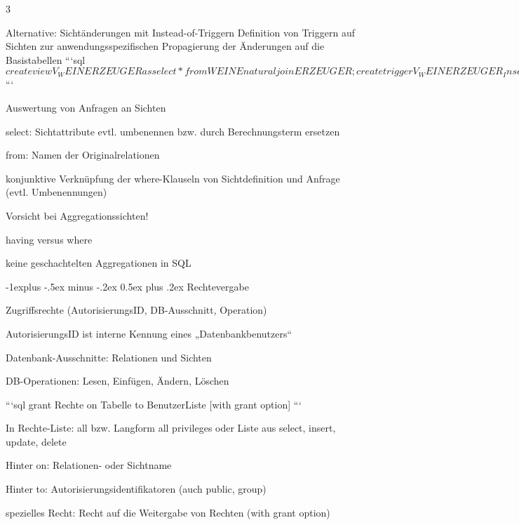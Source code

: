 \documentclass[a4paper]{article}
\makeatletter
\renewcommand{\subsection}{\@startsection{subsection}{2}{0mm}%
                                {-1explus -.5ex minus -.2ex}%
                                {0.5ex plus .2ex}%
                                {\normalfont\normalsize\bfseries}}
\makeatother
\begin{document}
\begin{multicols}{3}
\begin{itemize*}
    Alternative: Sichtänderungen mit Instead-of-Triggern
    Definition von Triggern auf Sichten zur anwendungsspezifischen Propagierung der Änderungen auf die Basistabellen
    ```sql$
        create view V_WEINERZEUGER as
        select * from WEINE natural join ERZEUGER;
        create trigger V_WEINERZEUGER_Insert
        instead of insert on V_WEINERZEUGER
        referencing new as N
        for each row
        begin
        insert into WEINE values (:N.WeinID, :N.Name,
        :N.Farbe, :N.Jahrgang, :N.Weingut);
        end;$
    ```

    Auswertung von Anfragen an Sichten
    \begin{itemize*}
        \item select: Sichtattribute evtl. umbenennen bzw. durch Berechnungsterm ersetzen
        \item  from: Namen der Originalrelationen
        \item konjunktive Verknüpfung der where-Klauseln von Sichtdefinition und Anfrage (evtl. Umbenennungen)
        \item Vorsicht bei Aggregationssichten!
        \begin{itemize*}
            \item having versus where
            \item keine geschachtelten Aggregationen in SQL
        \end{itemize*}
    \end{itemize*}

    \subsection{Rechtevergabe}
    \begin{itemize*}
        \item Zugriffsrechte (AutorisierungsID, DB-Ausschnitt, Operation)
        \item AutorisierungsID ist interne Kennung eines „Datenbankbenutzers“
        \item Datenbank-Ausschnitte: Relationen und Sichten
        \item DB-Operationen: Lesen, Einfügen, Ändern, Löschen
    \end{itemize*}

    ```sql
    grant Rechte
    on Tabelle
    to BenutzerListe
        [with grant option]
    ```
    \begin{itemize*}
        \item In Rechte-Liste: all bzw. Langform all privileges oder Liste aus select, insert, update, delete
        \item Hinter on: Relationen- oder Sichtname
        \item Hinter to: Autorisierungsidentifikatoren (auch public, group)
        \item spezielles Recht: Recht auf die Weitergabe von Rechten (with grant option)
    \end{itemize*}


\end{itemize*}
\end{multicols}
\end{document}
